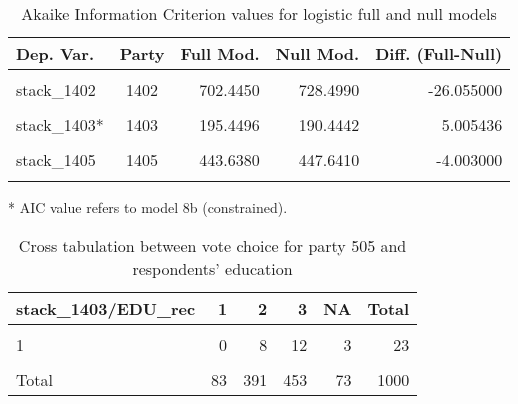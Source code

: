 \documentclass[
]{article}
\begin{document}
\begin{table}[!h]

\caption{\label{tab:unnamed-chunk-92}Akaike Information Criterion values for logistic full and null models 
        \label{table:logit_aic_ie}}
\centering
\begin{threeparttable}
\begin{tabular}[t]{lcrrr}
\toprule
Dep. Var. & Party & Full Mod. & Null Mod. & Diff. (Full-Null)\\
\midrule
\cellcolor{gray!6}{stack\_1401} & \cellcolor{gray!6}{1401} & \cellcolor{gray!6}{526.5670} & \cellcolor{gray!6}{532.3840} & \cellcolor{gray!6}{-5.817000}\\
stack\_1402 & 1402 & 702.4450 & 728.4990 & -26.055000\\
\cellcolor{gray!6}{stack\_1403} & \cellcolor{gray!6}{1403} & \cellcolor{gray!6}{195.8610} & \cellcolor{gray!6}{190.4440} & \cellcolor{gray!6}{5.417000}\\
stack\_1403* & 1403 & 195.4496 & 190.4442 & 5.005436\\
\cellcolor{gray!6}{stack\_1404} & \cellcolor{gray!6}{1404} & \cellcolor{gray!6}{534.5190} & \cellcolor{gray!6}{536.8130} & \cellcolor{gray!6}{-2.294000}\\
\addlinespace
stack\_1405 & 1405 & 443.6380 & 447.6410 & -4.003000\\
\cellcolor{gray!6}{stack\_1406} & \cellcolor{gray!6}{1406} & \cellcolor{gray!6}{235.9670} & \cellcolor{gray!6}{233.1430} & \cellcolor{gray!6}{2.825000}\\
\bottomrule
\end{tabular}
\begin{tablenotes}[para]
\item[*] AIC value refers to model 8b (constrained).
\end{tablenotes}
\end{threeparttable}
\end{table}

\begin{table}

\caption{\label{tab:unnamed-chunk-93}Cross tabulation between vote choice for party 505 and respondents' education 
                   \label{table:crosstab_1_ie}}
\centering
\begin{tabular}[t]{l|r|r|r|r|r}
\hline
stack\_1403/EDU\_rec & 1 & 2 & 3 & NA & Total\\
\hline
\cellcolor{gray!6}{0} & \cellcolor{gray!6}{80} & \cellcolor{gray!6}{365} & \cellcolor{gray!6}{421} & \cellcolor{gray!6}{66} & \cellcolor{gray!6}{932}\\
\hline
1 & 0 & 8 & 12 & 3 & 23\\
\hline
\cellcolor{gray!6}{NA} & \cellcolor{gray!6}{3} & \cellcolor{gray!6}{18} & \cellcolor{gray!6}{20} & \cellcolor{gray!6}{4} & \cellcolor{gray!6}{45}\\
\hline
Total & 83 & 391 & 453 & 73 & 1000\\
\hline
\end{tabular}
\end{table}
\end{document}
